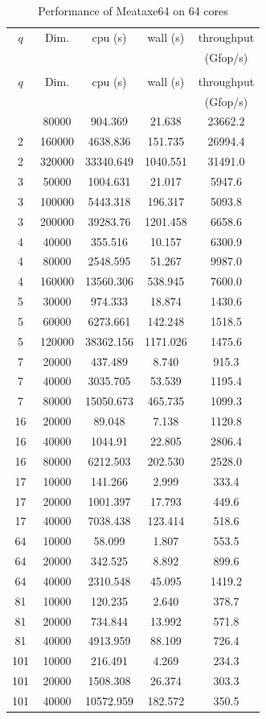 \begin{small}
\begin{center}
  \begin{longtable}{|c|c|c|c|c|}
    \caption[]{Performance of Meataxe64 on 64 cores}\label{fig:matmult:par}\\
    \hline
    $q$&Dim.&cpu (s)&wall (s) &throughput\\
    &&&&(Gfop/s)\\
    \hline
    \endfirsthead
    \caption[]{Performance of Meataxe64 on 64 cores}\\
    \hline
    $q$&Dim.&cpu (s)&wall (s) &throughput\\
    &&&&(Gfop/s)\\
    \hline
    \endhead
    \hline
    \endfoot
2&80000&904.369&21.638&23662.2\\
2&160000&4638.836&151.735&26994.4\\
2&320000&33340.649&1040.551&31491.0\\
3&50000&1004.631&21.017&5947.6\\
3&100000&5443.318&196.317&5093.8\\
3&200000&39283.76&1201.458&6658.6\\
4&40000&355.516&10.157&6300.9\\
4&80000&2548.595&51.267&9987.0\\
4&160000&13560.306&538.945&7600.0\\
5&30000&974.333&18.874&1430.6\\
5&60000&6273.661&142.248&1518.5\\
5&120000&38362.156&1171.026&1475.6\\
7&20000&437.489&8.740&915.3\\
7&40000&3035.705&53.539&1195.4\\
7&80000&15050.673&465.735&1099.3\\
16&20000&89.048&7.138&1120.8\\
16&40000&1044.91&22.805&2806.4\\
16&80000&6212.503&202.530&2528.0\\
17&10000&141.266&2.999&333.4\\
17&20000&1001.397&17.793&449.6\\
17&40000&7038.438&123.414&518.6\\
64&10000&58.099&1.807&553.5\\
64&20000&342.525&8.892&899.6\\
64&40000&2310.548&45.095&1419.2\\
81&10000&120.235&2.640&378.7\\
81&20000&734.844&13.992&571.8\\
81&40000&4913.959&88.109&726.4\\
101&10000&216.491&4.269&234.3\\
101&20000&1508.308&26.374&303.3\\
101&40000&10572.959&182.572&350.5\\
  \end{longtable}
\end{center}
\end{small}


